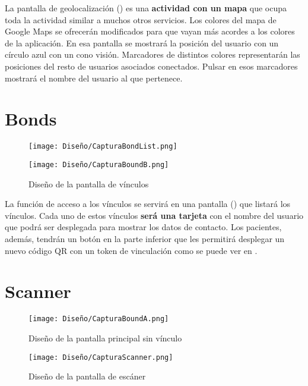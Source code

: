 La pantalla de geolocalización () es una \textbf{actividad con un mapa} que ocupa toda la actividad similar a muchos otros servicios. Los colores del mapa de Google Maps se ofrecerán modificados para que vayan más acordes a los colores de la aplicación. En esa pantalla se mostrará la posición del usuario con un círculo azul con un cono visión. Marcadores de distintos colores representarán las posiciones del resto de usuarios asociados conectados. Pulsar en esos marcadores mostrará el nombre del usuario al que pertenece.

\section{Bonds}

\begin{figure}[H]
    \centering
    \begin{minipage}{0.5\textwidth}
        \centering
        \texttt{[image: Diseño/CapturaBondList.png]}
        \label{scr:bonds}
    \end{minipage}\hfill
    \begin{minipage}{0.5\textwidth}
        \centering
        \texttt{[image: Diseño/CapturaBoundB.png]}
        \label{scr:bonds_qr}
    \end{minipage}\hfill
    \caption{Diseño de la pantalla de vínculos}
\end{figure}

La función de acceso a los vínculos se servirá en una pantalla () que listará los vínculos. Cada uno de estos vínculos \textbf{será una tarjeta} con el nombre del usuario que podrá ser desplegada para mostrar los datos de contacto. Los pacientes, además, tendrán un botón en la parte inferior que les permitirá desplegar un nuevo código QR con un \gls{token} de vinculación como se puede ver en .

\section{Scanner}

\begin{figure}[H]
    \centering
    \begin{minipage}{0.45\textwidth}
        \centering
        \texttt{[image: Diseño/CapturaBoundA.png]}
        \caption{Diseño de la pantalla principal sin vínculo}
        \label{scr:unbonded}
    \end{minipage}\hfill
    \begin{minipage}{0.45\textwidth}
        \centering
        \texttt{[image: Diseño/CapturaScanner.png]}
        \caption{Diseño de la pantalla de escáner}
        \label{scr:scanner}
    \end{minipage}\hfill
\end{figure}


